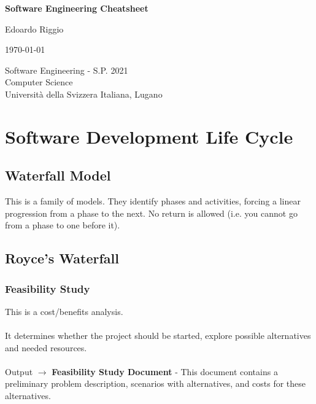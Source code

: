 \documentclass{article}
\begin{document}
\begin{titlepage}
    \begin{center}
        \vspace*{1cm}
        
        \Huge
        \textbf{Software Engineering Cheatsheet}
        
        \vspace{0.5cm}
        \LARGE
        
        \vspace{.5cm}
        
        Edoardo Riggio
   		  \vspace{1.5cm}
       
        \vfill
        
        \today
        
        \vspace{.8cm}
          \Large
          Software Engineering - S.P. 2021 \\
        Computer Science\\
        Universit\`{a} della Svizzera Italiana, Lugano\\
        
    \end{center}
\end{titlepage}

\tableofcontents

\newpage

\section{Software Development Life Cycle}
\subsection{Waterfall Model}
This is a family of models. They identify phases and activities, forcing a linear progression from a phase to the next. No return is allowed (i.e. you cannot go from a phase to one before it).

\subsection{Royce's Waterfall}
\subsubsection{Feasibility Study}
This is a cost/benefits analysis. \\ \\
It determines whether the project should be started, explore possible alternatives and needed resources. \\ \\
Output $\rightarrow$ \textbf{Feasibility Study Document} - This document contains a preliminary problem description, scenarios with alternatives, and costs for these alternatives.
\end{document}
